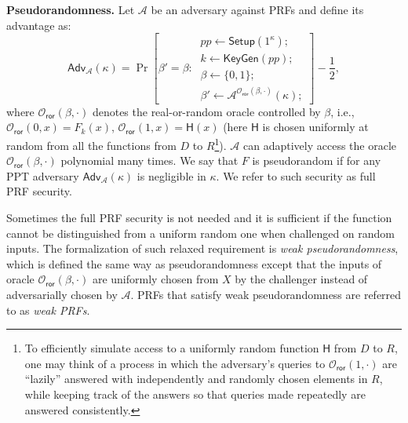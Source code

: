\documentclass[a4paper,10pt]{article}
\begin{document}
\begin{definition}[PRF]
\begin{trivlist}
\item \textbf{Pseudorandomness.} Let $\mathcal{A}$ be an adversary against PRFs and define its advantage as:
\begin{displaymath}
    \mathsf{Adv}_\mathcal{A}(\kappa) =
        \Pr \left[ \beta' = \beta:~
        \begin{array}{l}
            pp \leftarrow \mathsf{Setup}(1^\kappa);\\
            k \leftarrow \mathsf{KeyGen}(pp);\\
            \beta \leftarrow \{0,1\}; \\
            \beta' \leftarrow \mathcal{A}^{\mathcal{O}_\mathsf{ror}(\beta, \cdot)}(\kappa);
        \end{array} 
        \right] - \frac{1}{2},
\end{displaymath}
where $\mathcal{O}_\mathsf{ror}(\beta, \cdot)$ denotes the real-or-random oracle controlled by $\beta$, 
i.e., $\mathcal{O}_\mathsf{ror}(0, x) = F_k(x)$, $\mathcal{O}_\mathsf{ror}(1, x) = \mathsf{H}(x)$ 
(here $\mathsf{H}$ is chosen uniformly at random from all the functions 
from $D$ to $R$\footnote{To efficiently simulate access to a uniformly random function $\mathsf{H}$ from $D$ to $R$, 
one may think of a process in which the adversary's queries to $\mathcal{O}_\mathsf{ror}(1, \cdot)$ 
are ``lazily'' answered with independently and randomly chosen elements in $R$, 
while keeping track of the answers so that queries made repeatedly are answered consistently.}). 
$\mathcal{A}$ can adaptively access the oracle $\mathcal{O}_\mathsf{ror}(\beta, \cdot)$ polynomial many times.
We say that $F$ is pseudorandom if for any PPT adversary $\mathsf{Adv}_\mathcal{A}(\kappa)$ is negligible in $\kappa$. 
We refer to such security as full PRF security. 
\end{trivlist}
\end{definition}

Sometimes the full PRF security is not needed and it is sufficient 
if the function cannot be distinguished from a uniform random one when challenged on random inputs. 
The formalization of such relaxed requirement is \emph{weak pseudorandomness}, 
which is defined the same way as pseudorandomness except that the inputs of 
oracle $\mathcal{O}_\mathsf{ror}(\beta, \cdot)$ are uniformly chosen from $X$ by the challenger
instead of adversarially chosen by $\mathcal{A}$. 
PRFs that satisfy weak pseudorandomness are referred to as \emph{weak PRFs}.  
\end{document}
